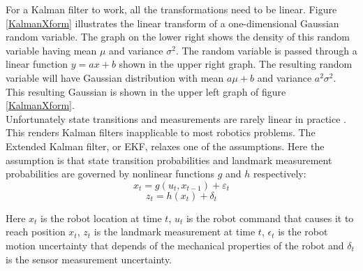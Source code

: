 \documentclass[conference]{IEEEtran}
\begin{document}
For a Kalman filter to work, all the transformations need to be linear. Figure \ref{KalmanXform} illustrates the linear transform of a one-dimensional Gaussian random variable. The graph on the lower right shows the density of this random variable having mean $\mu$ and variance $\sigma^2$. The random variable is passed through a linear function $y=ax+b$ shown in the upper right graph. The resulting random variable will have Gaussian distribution with mean $a\mu + b$ and variance $a^2\sigma^2$. This resulting Gaussian is shown in the upper left graph of figure \ref{KalmanXform}.\\

Unfortunately state transitions and measurements are rarely linear in practice \cite{thrun}. This renders Kalman filters inapplicable to most robotics problems. The Extended Kalman filter, or EKF, relaxes one of the assumptions. Here the assumption is that state transition probabilities and landmark measurement probabilities are governed by nonlinear functions $g$ and $h$ respectively:
\begin{equation}\label{transition}
x_{t} = g(u_{t}, x_{t-1}) + \varepsilon_{t}
\end{equation}
\begin{equation}\label{measurement}
z_{t} = h(x_{t}) + \delta_{t}
\end{equation}

Here $x_{t}$ is the robot location at time $t$, $u_{t}$ is the robot command that causes it to reach position $x_{t}$, $z_{t}$ is the landmark measurement at time $t$, $\epsilon_{t}$ is the robot motion uncertainty that depends of the mechanical properties of the robot and $\delta_{t}$ is the sensor measurement uncertainty. \\
\end{document}
